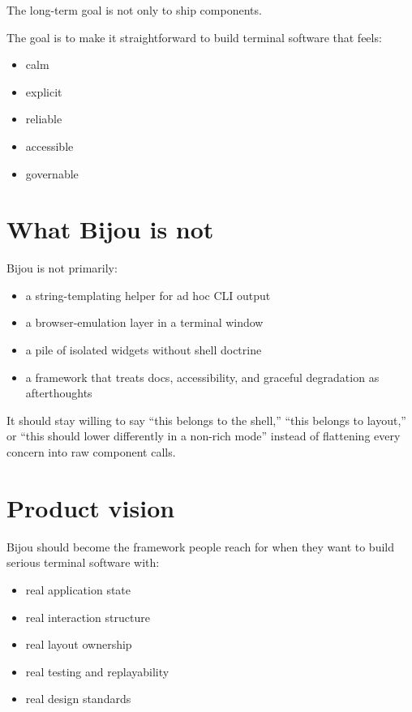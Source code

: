 The long-term goal is not only to ship components.

The goal is to make it straightforward to build terminal software that feels:

\begin{itemize}
\tightlist
\item
  calm
\item
  explicit
\item
  reliable
\item
  accessible
\item
  governable
\end{itemize}

\section{What Bijou is not}\label{record-035-what-bijou-is-not}

Bijou is not primarily:

\begin{itemize}
\tightlist
\item
  a string-templating helper for ad hoc CLI output
\item
  a browser-emulation layer in a terminal window
\item
  a pile of isolated widgets without shell doctrine
\item
  a framework that treats docs, accessibility, and graceful degradation as afterthoughts
\end{itemize}

It should stay willing to say ``this belongs to the shell,'' ``this belongs to layout,'' or ``this should lower differently in a non-rich mode'' instead of flattening every concern into raw component calls.

\section{Product vision}\label{record-035-product-vision}

Bijou should become the framework people reach for when they want to build serious terminal software with:

\begin{itemize}
\tightlist
\item
  real application state
\item
  real interaction structure
\item
  real layout ownership
\item
  real testing and replayability
\item
  real design standards
\end{itemize}

